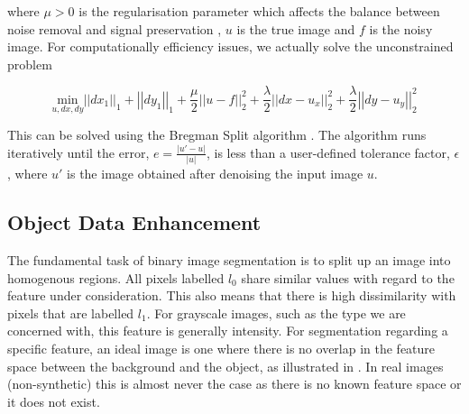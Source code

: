\begin{definition}
	where $\mu > 0$ is the regularisation parameter which affects the balance between noise removal and signal preservation \citep{Getreuer2012}, $u$ is the true image and $f$ is the noisy image. For computationally efficiency issues, we actually solve the unconstrained problem
	
	\begin{equation}
	\underset{u, dx, dy} {\mathrm{min}} \left| \left|dx_1 \right| \right|_1 + \left| \left| dy_1 \right| \right|_1 + \frac{\mu}{2} \left| \left| u-f \right| \right|^2_2 +
	\frac{\lambda}{2} \left| \left| dx-u_x \right| \right|^2_2 + \frac{\lambda}{2} \left| \left| dy-u_y \right| \right|^2_2
	\label{equ:anisotropic_tv_unconstrained}
	\end{equation}
	
	This can be solved using the Bregman Split algorithm \citep{Wei2010}.
	The algorithm runs iteratively until the error, $e = \frac{\vert u'-u \vert}{\vert u \vert}$,  is less than a user-defined tolerance factor, $\epsilon$, where $u'$ is the image obtained after denoising the input image $u$. 
\end{definition}

\subsection{Object Data Enhancement}
\label{sec:contrastcorrection}

The fundamental task of binary image segmentation is to split up an image into homogenous regions. All pixels labelled $l_0$ share similar values with regard to the feature under consideration. This also means that there is high dissimilarity with pixels that are labelled $l_1$. For grayscale images, such as the type we are concerned with, this feature is generally intensity.
For segmentation regarding a specific feature, an ideal image is one where there is no overlap in the feature space between the background and the object, as illustrated in . In real images (non-synthetic) this is almost never the case as there is no known feature space or it does not exist.

